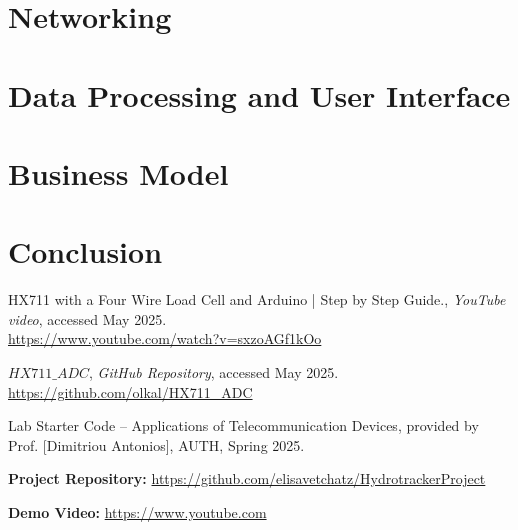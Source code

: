 \documentclass{article}
\begin{document}
\section{Networking}


\section{Data Processing and User Interface}


\section{Business Model}


\section{Conclusion}


\begin{thebibliography}{9}

HX711 with a Four Wire Load Cell and Arduino | Step by Step Guide., 
\textit{YouTube video}, accessed May 2025. \\
\url{https://www.youtube.com/watch?v=sxzoAGf1kOo}

$HX711\_ADC$, 
\textit{GitHub Repository}, accessed May 2025. \\
\url{https://github.com/olkal/HX711_ADC}

Lab Starter Code – Applications of Telecommunication Devices, 
provided by Prof. [Dimitriou Antonios], AUTH, Spring 2025.


\end{thebibliography}

\textbf{Project Repository:} \url{https://github.com/elisavetchatz/HydrotrackerProject}

\textbf{Demo Video:} \url{https://www.youtube.com}
\end{document}
